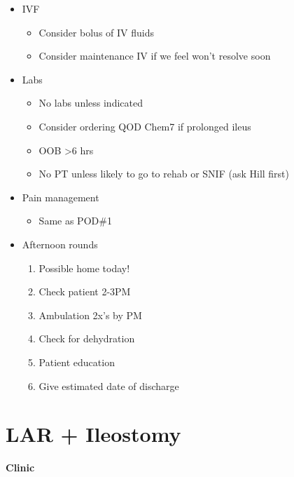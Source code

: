 \documentclass[
]{book}
\providecommand{\tightlist}{%
  \setlength{\itemsep}{0pt}\setlength{\parskip}{0pt}}
\begin{document}
\begin{itemize}
\item
  IVF

  \begin{itemize}
  \tightlist
  \item
    Consider bolus of IV fluids
  \item
    Consider maintenance IV if we feel won't resolve soon
  \end{itemize}
\item
  Labs

  \begin{itemize}
  \tightlist
  \item
    No labs unless indicated
  \item
    Consider ordering QOD Chem7 if prolonged ileus
  \item
    OOB \textgreater6 hrs
  \item
    No PT unless likely to go to rehab or SNIF (ask Hill first)
  \end{itemize}
\item
  Pain management

  \begin{itemize}
  \tightlist
  \item
    Same as POD\#1
  \end{itemize}
\item
  Afternoon rounds

  \begin{enumerate}
  \def\labelenumi{\arabic{enumi})}
  \tightlist
  \item
    Possible home today!
  \item
    Check patient 2-3PM
  \item
    Ambulation 2x's by PM
  \item
    Check for dehydration
  \item
    Patient education
  \item
    Give estimated date of discharge
  \end{enumerate}
\end{itemize}

\hypertarget{lar-ileostomy}{%
\chapter{LAR + Ileostomy}\label{lar-ileostomy}}

\textbf{Clinic}
\end{document}
